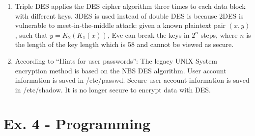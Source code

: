 \documentclass[11pt,a4paper]{article}
\begin{document}
\begin{enumerate}
	\item Triple DES applies the DES cipher algorithm three times to each data block with different keys. 3DES is used instead of double DES is because 2DES is vulnerable to meet-in-the-middle attack: given a known plaintext pair $(x,y)$, such that $y = K_{2}(K_{1}(x))$, Eve can break the keys in $2^{n}$ steps, where $n$ is the length of the key length which is 58 and cannot be viewed as secure.
	
	\item According to ``Hints for user passwords'': The legacy UNIX System encryption method is based on the NBS DES algorithm. User account information is saved in /etc/passwd. Secure user account information is saved in /etc/shadow. It is no longer secure to encrypt data with DES.
\end{enumerate}

\section*{Ex. 4 - Programming}
\end{document}
